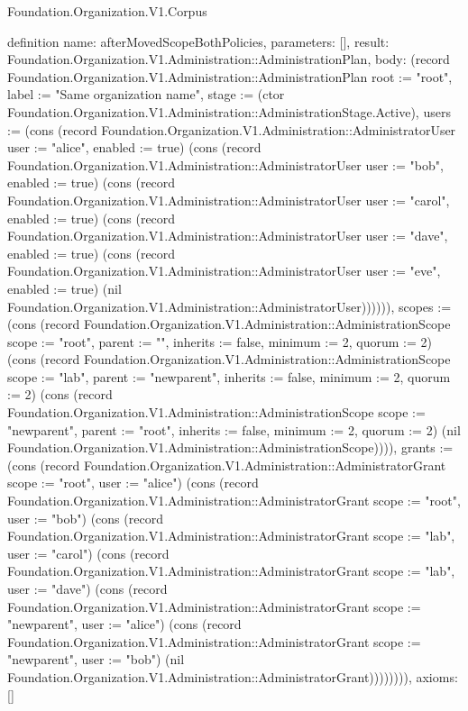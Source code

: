 \begin{lexlean}{Foundation.Organization.V1.Corpus}
\begin{semanticmodule}
definition{
  name: afterMovedScopeBothPolicies,
  parameters: [],
  result: Foundation.Organization.V1.Administration::AdministrationPlan,
  body: (record Foundation.Organization.V1.Administration::AdministrationPlan {root := "root", label := "Same organization name", stage := (ctor Foundation.Organization.V1.Administration::AdministrationStage.Active), users := (cons (record Foundation.Organization.V1.Administration::AdministratorUser {user := "alice", enabled := true}) (cons (record Foundation.Organization.V1.Administration::AdministratorUser {user := "bob", enabled := true}) (cons (record Foundation.Organization.V1.Administration::AdministratorUser {user := "carol", enabled := true}) (cons (record Foundation.Organization.V1.Administration::AdministratorUser {user := "dave", enabled := true}) (cons (record Foundation.Organization.V1.Administration::AdministratorUser {user := "eve", enabled := true}) (nil Foundation.Organization.V1.Administration::AdministratorUser)))))), scopes := (cons (record Foundation.Organization.V1.Administration::AdministrationScope {scope := "root", parent := "", inherits := false, minimum := 2, quorum := 2}) (cons (record Foundation.Organization.V1.Administration::AdministrationScope {scope := "lab", parent := "newparent", inherits := false, minimum := 2, quorum := 2}) (cons (record Foundation.Organization.V1.Administration::AdministrationScope {scope := "newparent", parent := "root", inherits := false, minimum := 2, quorum := 2}) (nil Foundation.Organization.V1.Administration::AdministrationScope)))), grants := (cons (record Foundation.Organization.V1.Administration::AdministratorGrant {scope := "root", user := "alice"}) (cons (record Foundation.Organization.V1.Administration::AdministratorGrant {scope := "root", user := "bob"}) (cons (record Foundation.Organization.V1.Administration::AdministratorGrant {scope := "lab", user := "carol"}) (cons (record Foundation.Organization.V1.Administration::AdministratorGrant {scope := "lab", user := "dave"}) (cons (record Foundation.Organization.V1.Administration::AdministratorGrant {scope := "newparent", user := "alice"}) (cons (record Foundation.Organization.V1.Administration::AdministratorGrant {scope := "newparent", user := "bob"}) (nil Foundation.Organization.V1.Administration::AdministratorGrant)))))))}),
  axioms: []
}


\end{semanticmodule}
\end{lexlean}
